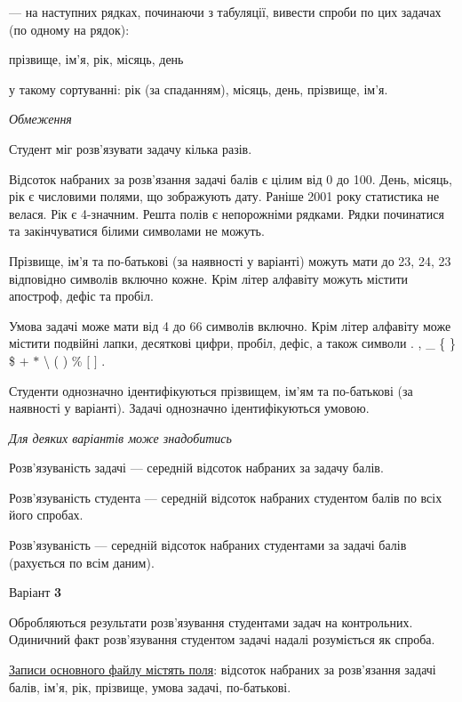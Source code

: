 \documentclass[11pt, ukrainian]{article}
\begin{document}
{\noindent}--- на наступних рядках, починаючи з табуляції, вивести спроби по цих задачах (по одному на рядок):\par
прізвище, ім’я, рік, місяць, день

{\noindent}у такому сортуванні: рік (за спаданням), місяць, день, прізвище, ім’я.


\bigskip\textit{Обмеження}

Студент міг розв’язувати задачу кілька разів.

Відсоток набраних за розв’язання задачі балів є цілим від 0 до 100.
День, місяць, рік є числовими полями, що зображують дату.
Раніше 2001 року статистика не велася. Рік є 4-значним.
Решта полів є непорожніми рядками.
Рядки починатися та закінчуватися білими символами не можуть.

Прізвище, ім’я та по-батькові (за наявності у варіанті) можуть мати до 23, 24, 23 відповідно символів включно кожне. 
Крім літер алфавіту можуть містити апостроф, дефіс та пробіл.

Умова задачі може мати від 4 до 66 символів включно.
Крім літер алфавіту може містити подвійні лапки, десяткові цифри, пробіл, дефіс,
а також символи . , \_ \{ \} \$ $+$ $*$ {\textbackslash} ( ) \% $[$ $]$ .

Студенти однозначно ідентифікуються прізвищем, ім’ям та по-батькові (за наявності у варіанті).
Задачі однозначно ідентифікуються умовою.

\bigskip\textit{Для деяких варіантів може знадобитись}

Розв'язуваність задачі --- середній відсоток набраних за задачу балів.

Розв'язуваність студента --- середній відсоток набраних студентом балів по всіх його спробах.

Розв'язуваність --- середній відсоток набраних студентами за задачі балів (рахується по всім даним).


\par
\newpage
{\center Варіант  \No \textbf { 3 }\par}
\bigskip
Обробляються результати розв’язування студентами задач на контрольних.
Одиничний факт роз\-в’я\-зу\-вання студентом задачі надалі розуміється як спроба.

\underline{Записи основного файлу містять поля}: відсоток набраних за розв’язання задачі балів, ім’я, рік, прізвище, умова задачі, по-батькові.
\end{document}
